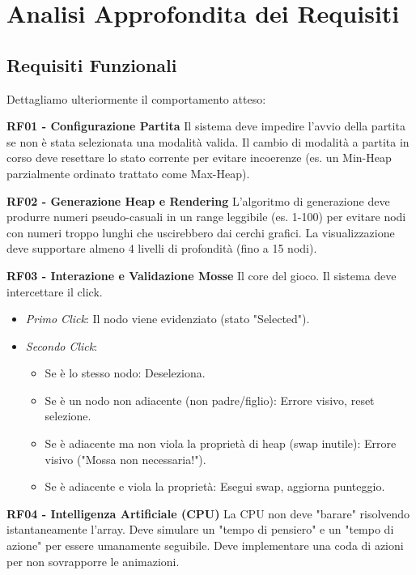\documentclass[openany]{theme/uniprthesis}
\begin{document}
\section{Analisi Approfondita dei Requisiti}

\subsection{Requisiti Funzionali}
Dettagliamo ulteriormente il comportamento atteso:

\noindent
\textbf{RF01 - Configurazione Partita}
Il sistema deve impedire l'avvio della partita se non è stata selezionata una modalità valida. Il cambio di modalità a partita in corso deve resettare lo stato corrente per evitare incoerenze (es. un Min-Heap parzialmente ordinato trattato come Max-Heap).

\noindent
\textbf{RF02 - Generazione Heap e Rendering}
L'algoritmo di generazione deve produrre numeri pseudo-casuali in un range leggibile (es. 1-100) per evitare nodi con numeri troppo lunghi che uscirebbero dai cerchi grafici. La visualizzazione deve supportare almeno 4 livelli di profondità (fino a 15 nodi).

\noindent
\textbf{RF03 - Interazione e Validazione Mosse}
Il core del gioco. Il sistema deve intercettare il click.
\begin{itemize}
    \item \textit{Primo Click}: Il nodo viene evidenziato (stato "Selected").
    \item \textit{Secondo Click}:
    \begin{itemize}
        \item Se è lo stesso nodo: Deseleziona.
        \item Se è un nodo non adiacente (non padre/figlio): Errore visivo, reset selezione.
        \item Se è adiacente ma non viola la proprietà di heap (swap inutile): Errore visivo ("Mossa non necessaria!").
        \item Se è adiacente e viola la proprietà: Esegui swap, aggiorna punteggio.
    \end{itemize}
\end{itemize}

\noindent
\textbf{RF04 - Intelligenza Artificiale (CPU)}
La CPU non deve "barare" risolvendo istantaneamente l'array. Deve simulare un "tempo di pensiero" e un "tempo di azione" per essere umanamente seguibile. Deve implementare una coda di azioni per non sovrapporre le animazioni.
\end{document}
